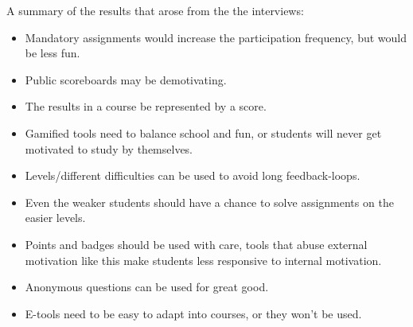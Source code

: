 A summary of the results that arose from the the interviews:
\begin{itemize}
 \item Mandatory assignments would increase the participation frequency, but would be less fun.
 \item Public scoreboards may be demotivating.
 \item The results in a course be represented by a score.
 \item Gamified tools need to balance school and fun, or students will never get motivated to study by themselves.
 \item Levels/different difficulties can be used to avoid long feedback-loops.
 \item Even the weaker students should have a chance to solve assignments on the easier levels.
 \item Points and badges should be used with care, tools that abuse external motivation like this make students less responsive to internal motivation.
 \item Anonymous questions can be used for great good.
 \item E-tools need to be easy to adapt into courses, or they won't be used.
\end{itemize}
